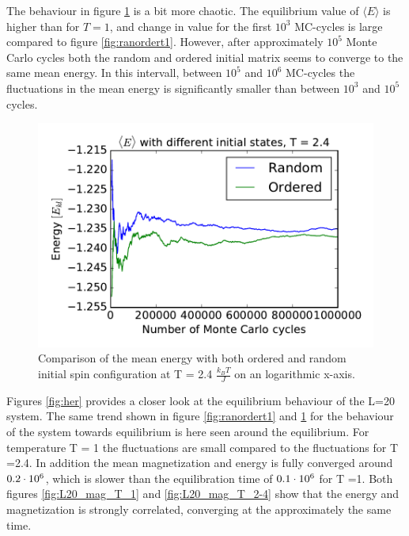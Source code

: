 The behaviour in figure \ref{fig:ranordert2} is a bit more chaotic. The equilibrium value of $ \langle E \rangle  $ is higher than for $ T=1 $, and change in value for the first $ 10^{3} $ MC-cycles is large compared to figure \ref{fig:ranordert1}. However, after approximately  $ 10^{5} $ Monte Carlo cycles both the random and ordered initial matrix seems to converge to the same mean energy. In this intervall, between $ 10^{5} $ and $ 10^{6} $ MC-cycles the fluctuations in the mean energy is significantly smaller than between  $ 10^{3} $ and $ 10^{5} $ cycles. 


\begin{figure}[H]
		\centering
	\includegraphics[width=0.7\linewidth]{../results/4c/ran_order_T2}
	\caption{Comparison of the mean energy with both ordered and random initial spin configuration at T = 2.4 $\frac{k_BT}{J}  $ on an logarithmic x-axis.}
	\label{fig:ranordert2}
\end{figure}

Figures \ref{fig:her} provides a closer look at the equilibrium behaviour of the L=20 system. The same trend shown  in figure \ref{fig:ranordert1} and \ref{fig:ranordert2} for the behaviour of the system towards equilibrium is here seen around the equilibrium. For temperature T = 1 the fluctuations are small compared to the fluctuations for T =2.4. In addition the mean magnetization and energy is fully converged around $ 0.2\cdot 10^{6} $, which is slower than the equilibration time of  $ 0.1\cdot 10^{6} $ for T =1. Both figures  \ref{fig:L20_mag_T_1} and \ref{fig:L20_mag_T_2-4} show that the energy and magnetization is strongly correlated, converging at the approximately the same time.

